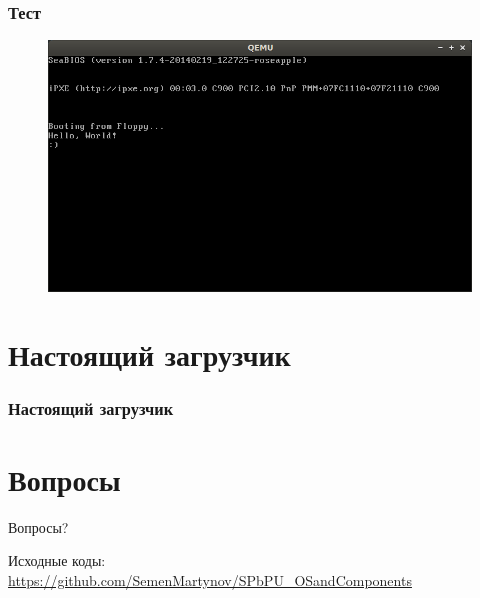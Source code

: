 \documentclass{beamer}
\begin{document}
\begin{frame}
\frametitle{Тест}

\begin{figure}
\includegraphics[scale=0.48]{res/qemu}
\end{figure}

\end{frame}

\section{Настоящий загрузчик}

\begin{frame}
\frametitle{Настоящий загрузчик}



\end{frame}

\section{Вопросы}

\begin{frame}
\begin{minipage}[t][.8\textheight]{\textwidth}
	\vspace{5em}
    {\Huge{\centerline{Вопросы?}}}

    \vfill

    Исходные коды:\\ \url{https://github.com/SemenMartynov/SPbPU_OSandComponents}
\end{minipage}
\end{frame}

\end{document}
